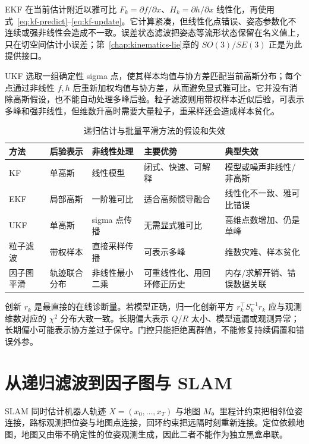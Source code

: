 EKF 在当前估计附近以雅可比 $F_k=\partial f/\partial x$、$H_k=\partial h/\partial x$ 线性化，再使用式~\eqref{eq:kf-predict}--\eqref{eq:kf-update}。它计算紧凑，但线性化点错误、姿态参数化不连续或强非线性会造成不一致。误差状态滤波把姿态等流形状态保留在名义值上，只在切空间估计小误差；第~\ref{chap:kinematics-lie}章的 $SO(3)/SE(3)$ 正是为此提供接口\cite{sola2017quaternion,barfoot2024state}。

UKF 选取一组确定性 sigma 点，使其样本均值与协方差匹配当前高斯分布；每个点通过非线性 $f,h$ 后重新加权均值与协方差，从而避免显式雅可比\cite{julier2004ukf}。它并没有消除高斯假设，也不能自动处理多峰后验。粒子滤波则用带权样本近似后验，可表示多峰和强非线性，但维数升高时需要大量粒子，重采样还会造成样本贫化。

\begin{table}[H]
\centering
\caption{递归估计与批量平滑方法的假设和失效}
\label{tab:estimators-comparison}
\begin{tabularx}{\textwidth}{p{}YYYY}
\toprule
方法 & 后验表示 & 非线性处理 & 主要优势 & 典型失效 \\
\midrule
KF & 单高斯 & 线性模型 & 闭式、快速、可解释 & 模型或噪声非线性/非高斯 \\
EKF & 局部高斯 & 一阶雅可比 & 适合高频惯导融合 & 线性化不一致、雅可比错误 \\
UKF & 单高斯 & sigma 点传播 & 无需显式雅可比 & 高维点数增加、仍是单峰 \\
粒子滤波 & 带权样本 & 直接采样传播 & 可表示多峰 & 维数灾难、样本贫化 \\
因子图平滑 & 轨迹联合分布 & 非线性最小二乘 & 可重线性化、用回环修正历史 & 内存/求解开销、错误数据关联 \\
\bottomrule
\end{tabularx}
\end{table}

创新 $r_k$ 是最直接的在线诊断量。若模型正确，归一化创新平方 $r_k^\top S_k^{-1}r_k$ 应与观测维数对应的 $\chi^2$ 分布大致一致。长期偏大表示 $Q/R$ 太小、模型遗漏或观测异常；长期偏小可能表示协方差过于保守。门控只能拒绝离群值，不能修复持续偏置和错误外参。

\section{从递归滤波到因子图与 SLAM}

SLAM 同时估计机器人轨迹 $X=(x_0,\ldots,x_T)$ 与地图 $M$。里程计约束把相邻位姿连接，路标观测把位姿与地图点连接，回环约束把远隔时刻重新连接。定位依赖地图，地图又由带不确定性的位姿观测生成，因此二者不能作为独立黑盒串联\cite{durrantwhyte2006slam}。

